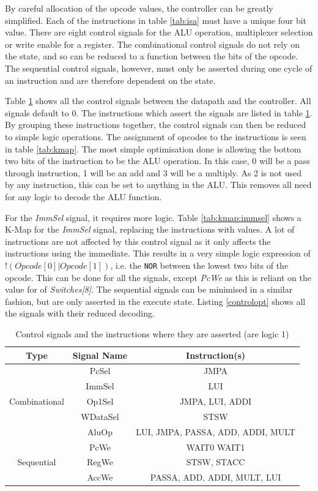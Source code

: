 By careful allocation of the opcode values, the controller can be greatly simplified. 
Each of the instructions in table \ref{tab:isa} must have a unique four bit value. 
There are eight control signals for the ALU operation, multiplexer selection or write enable for a register. 
The combinational control signals do not rely on the state, and so can be reduced to a function between the bits of the opcode. 
The sequential control signals, however, must only be asserted during one cycle of an instruction and are therefore dependent on the state. 

Table \ref{tab:controlsignals} shows all the control signals between the datapath and the controller. 
All signals default to 0.
The instructions which assert the signals are listed in table \ref{tab:controlsignals}. 
By grouping these instructions together, the control signals can then be reduced to simple logic operations.
The assignment of opcodes to the instructions is seen in table \ref{tab:kmap}. 
The most simple optimisation done is allowing the bottom two bits of the instruction to be the ALU operation. 
In this case, 0 will be a pass through instruction, 1 will be an add and 3 will be a multiply. 
As 2 is not used by any instruction, this can be set to anything in the ALU.
This removes all need for any logic to decode the ALU function. 

For the \textit{ImmSel} signal, it requires more logic. 
Table \ref{tab:kmap:immsel} shows a K-Map for the \textit{ImmSel} signal, replacing the instructions with values.
A lot of instructions are not affected by this control signal as it only affects the instructions using the immediate. 
This results in a very simple logic expression of $!(Opcode[0] | Opcode[1])$, i.e. the \texttt{NOR} between the lowest two bits of the opcode. 
This can be done for all the signals, except \textit{PcWe} as this is reliant on the value for of \textit{Switches[8]}. 
The sequential signals can be minimised in a similar fashion, but are only asserted in the execute state.
Listing \ref{controlopt} shows all the signals with their reduced decoding. 

\begin{table}
\caption{Control signals and the instructions where they are asserted (are logic 1)}
\label{tab:controlsignals}
\centering
\begin{tabular}{ccc} \toprule
Type & Signal Name & Instruction(s) \\ \midrule
\multirow{5}{*}{Combinational} & PcSel & JMPA \\ 
 & ImmSel & LUI \\
 & Op1Sel & JMPA, LUI, ADDI \\
 & WDataSel & STSW \\ 
 & AluOp & LUI, JMPA, PASSA, ADD, ADDI, MULT \\ \midrule
\multirow{3}{*}{Sequential} & PcWe & WAIT0 WAIT1 \\
 & RegWe & STSW, STACC \\
 & AccWe &  PASSA, ADD, ADDI, MULT, LUI \\ \bottomrule

\end{tabular}
\end{table}

